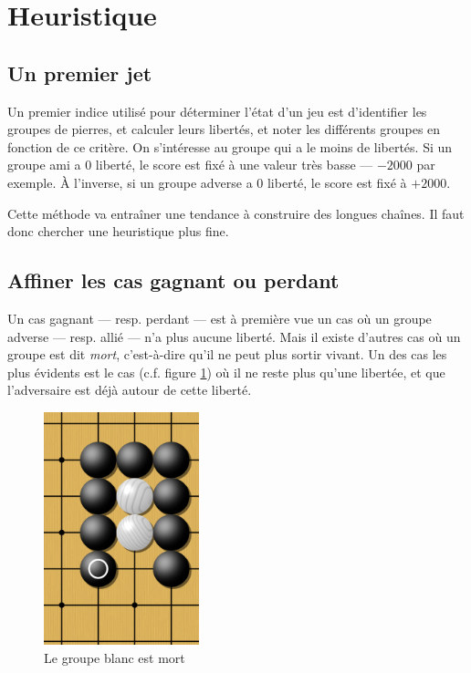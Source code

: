 \documentclass[11pt,a4paper,titlepage,french]{article}
\begin{document}
	\section{Heuristique}

		\subsection{Un premier jet}
			Un premier indice utilisé pour déterminer l'état d'un jeu est d'identifier les groupes de pierres, et calculer leurs libertés, et noter les différents groupes en fonction de ce critère. On s'intéresse au groupe qui a le moins de libertés. Si un groupe ami a 0 liberté, le score est fixé à une valeur très basse --- $-2000$ par exemple. À l'inverse, si un groupe adverse a 0 liberté, le score est fixé à $+2000$.

			Cette méthode va entraîner une tendance à construire des longues chaînes. Il faut donc chercher une heuristique plus fine.

		\subsection{Affiner les cas gagnant ou perdant}
			Un cas gagnant --- resp. perdant --- est à première vue un cas où un groupe adverse --- resp. allié --- n'a plus aucune liberté. Mais il existe d'autres cas où un groupe est dit \emph{mort}, c'est-à-dire qu'il ne peut plus sortir vivant. Un des cas les plus évidents est le cas (c.f. figure \ref{groupemort}) où il ne reste plus qu'une libertée, et que l'adversaire est déjà autour de cette liberté.

			\begin{figure}[hbt]
			\label{groupemort}
			\begin{center}
			\includegraphics[width=0.4\textwidth]{groupemort.png}
			\end{center}
			\caption{Le groupe blanc est mort}

			\end{figure}
\end{document}
